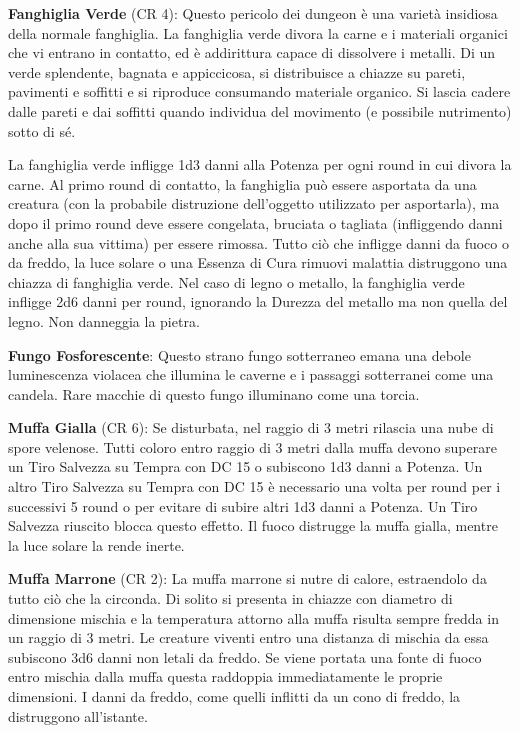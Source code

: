 \documentclass[a4paper,11pt,twoside,openany]{book}
\begin{document}
{\textbf{Fanghiglia Verde} (CR 4): Questo pericolo dei dungeon è una varietà insidiosa della normale fanghiglia. La fanghiglia verde divora la carne e i materiali organici che vi entrano in contatto, ed è addirittura capace di dissolvere i metalli. Di un verde splendente, bagnata e appiccicosa, si distribuisce a chiazze su pareti, pavimenti e soffitti e si riproduce consumando materiale organico. Si lascia cadere dalle pareti e dai soffitti quando individua del movimento (e possibile nutrimento) sotto di sé.

La fanghiglia verde infligge 1d3 danni alla Potenza per ogni round in cui divora la carne. Al primo round di contatto, la fanghiglia può essere asportata da una creatura (con la probabile distruzione dell'oggetto utilizzato per asportarla), ma dopo il primo round deve essere congelata, bruciata o tagliata (infliggendo danni anche alla sua vittima) per essere rimossa. Tutto ciò che infligge danni da fuoco o da freddo, la luce solare o una Essenza di Cura rimuovi malattia distruggono una chiazza di fanghiglia verde. Nel caso di legno o metallo, la fanghiglia verde infligge 2d6 danni per round, ignorando la Durezza del metallo ma non quella del legno. Non danneggia la pietra.

\textbf{Fungo Fosforescente}: Questo strano fungo sotterraneo emana una debole luminescenza violacea che illumina le caverne e i passaggi sotterranei come una candela. Rare macchie di questo fungo illuminano come una torcia.

\textbf{Muffa Gialla} (CR 6): Se disturbata, nel raggio di 3 metri rilascia una nube di spore velenose. Tutti coloro entro raggio di 3 metri dalla muffa devono superare un Tiro Salvezza su Tempra con DC 15 o subiscono 1d3 danni a Potenza. Un altro Tiro Salvezza su Tempra con DC 15 è necessario una volta per round per i successivi 5 round o per evitare di subire altri 1d3 danni a Potenza. Un Tiro Salvezza riuscito blocca questo effetto. Il fuoco distrugge la muffa gialla, mentre la luce solare la rende inerte.

\textbf{Muffa Marrone} (CR 2): La muffa marrone si nutre di calore, estraendolo da tutto ciò che la circonda. Di solito si presenta in chiazze con diametro di dimensione mischia e la temperatura attorno alla muffa risulta sempre fredda in un raggio di 3 metri. Le creature viventi entro una distanza di mischia da essa subiscono 3d6 danni non letali da freddo. Se viene portata una fonte di fuoco entro mischia dalla muffa questa raddoppia immediatamente le proprie dimensioni. I danni da freddo, come quelli inflitti da un cono di freddo, la distruggono all'istante.

}
\end{document}
